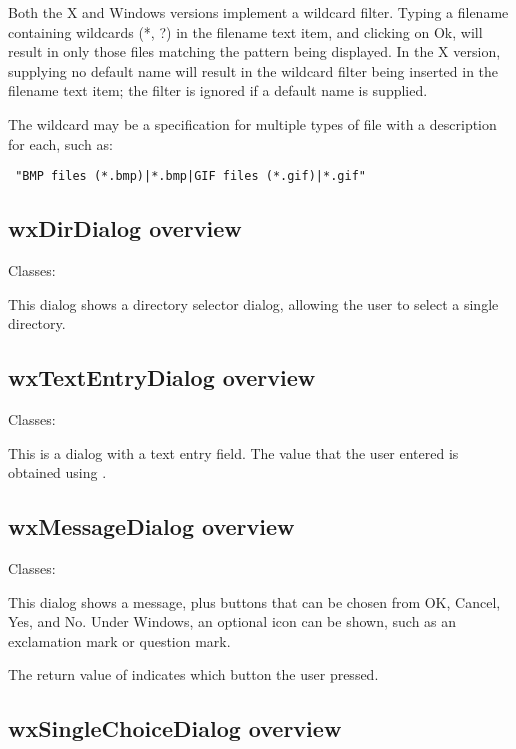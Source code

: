 Both the X and Windows versions implement a wildcard filter. Typing a
filename containing wildcards (*, ?) in the filename text item, and
clicking on Ok, will result in only those files matching the pattern being
displayed. In the X version, supplying no default name will result in the
wildcard filter being inserted in the filename text item; the filter is
ignored if a default name is supplied.

The wildcard may be a specification for multiple
types of file with a description for each, such as:

\begin{verbatim}
 "BMP files (*.bmp)|*.bmp|GIF files (*.gif)|*.gif"
\end{verbatim}

\subsection{wxDirDialog overview}\label{wxdirdialogoverview}

Classes: 

This dialog shows a directory selector dialog, allowing the user to select a single
directory.

\subsection{wxTextEntryDialog overview}\label{wxtextentrydialogoverview}

Classes: 

This is a dialog with a text entry field. The value that the user
entered is obtained using .

\subsection{wxMessageDialog overview}\label{wxmessagedialogoverview}

Classes: 

This dialog shows a message, plus buttons that can be chosen from OK, Cancel, Yes, and No.
Under Windows, an optional icon can be shown, such as an exclamation mark or question mark.

The return value of  indicates
which button the user pressed.

\subsection{wxSingleChoiceDialog overview}\label{wxsinglechoicedialogoverview}

